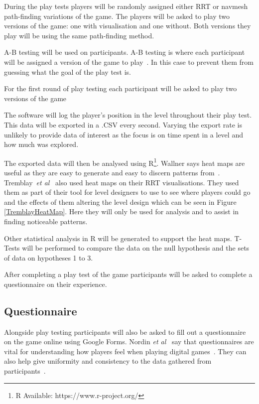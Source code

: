 \documentclass[journal]{IEEEtran}
\begin{document}
During the play tests players will be randomly assigned either RRT or navmesh path-finding variations of the game. The players will be asked to play two versions of the game: one with visualisation and one without. Both versions they play will be using the same path-finding method.

A-B testing will be used on participants. A-B testing is where each participant will be assigned a version of the game to play~\cite{Hynninen2014}. In this case to prevent them from guessing what the goal of the play test is. 

For the first round of play testing each participant will be asked to play two versions of the game 

The software will log the player's position in the level throughout their play test. This data will be exported in a .CSV every second. Varying the export rate is unlikely to provide data of interest as the focus is on time spent in a level and how much was explored. 

The exported data will then be analysed using R\footnote[2]{R Available: https://www.r-project.org/}. Wallner says heat maps are useful as they are easy to generate and easy to discern patterns from~\cite{Wallner2015}.  Tremblay~\textit{et al}~\cite{Tremblay2014} also used heat maps on their RRT visualisations. They used them as part of their tool for level designers to use to see where players could go and the effects of them altering the level design which can be seen in Figure \ref{TremblayHeatMap}. Here they will only be used for analysis and to assist in finding noticeable patterns.

Other statistical analysis in R will be generated to support the heat maps. T-Tests will be performed to compare the data on the null hypothesis and the sets of data on hypotheses 1 to 3.
 
After completing a play test of the game participants will be asked to complete a questionnaire on their experience.

\subsection{Questionnaire} \label{Questionnaire}

Alongside play testing participants will also be asked to fill out a questionnaire on the game online using Google Forms. Nordin \textit{et al}~\cite{nordin2014} say that questionnaires are vital for understanding how players feel when playing digital games~\cite{nordin2014,Denisova2016}. They can also help give uniformity and consistency to the data gathered from participants~\cite{Denisova2016}.
\end{document}
